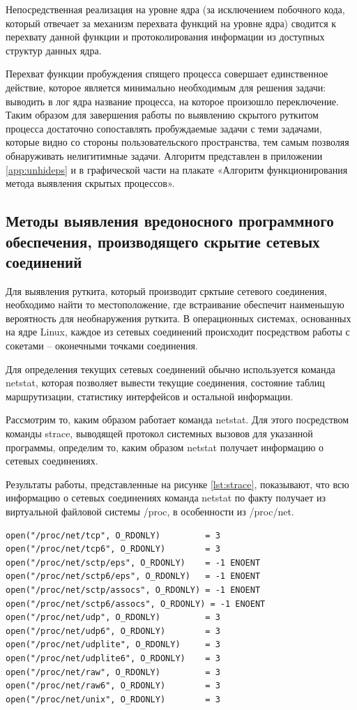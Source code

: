 \documentclass{gost7.32-2001}
\begin{document}
Непосредственная реализация на уровне ядра (за исключением побочного
кода, который отвечает за механизм перехвата функций на уровне ядра)
сводится к перехвату данной функции и протоколирования информации из
доступных структур данных ядра.

Перехват функции пробуждения спящего процесса совершает
единственное действие, которое является минимально необходимым для
решения задачи: выводить в лог ядра название процесса, на которое
произошло переключение. Таким образом для завершения работы по
выявлению скрытого руткитом процесса достаточно сопоставлять
пробуждаемые задачи с теми задачами, которые видно со стороны
пользовательского пространства, тем самым позволяя обнаруживать
нелигитимные задачи. Алгоритм представлен в приложении
\ref{app:unhideps} и в графической части на плакате «Алгоритм
функционирования метода выявления скрытых процессов».

\subsection{Методы выявления вредоносного программного обеспечения, производящего скрытие сетевых соединений}

Для выявления руткита, который производит срктыие сетевого соединения,
необходимо найти то местоположение, где встраивание обеспечит
наименьшую вероятность для необнаружения руткита. В операционных
системах, основанных на ядре Linux, каждое из сетевых соединений
происходит посредством работы с сокетами  – оконечными точками
соединения.

Для определения текущих сетевых соединений обычно используется команда
netstat, которая позволяет вывести текущие соединения, состояние
таблиц маршрутизации, статистику интерфейсов и остальной информации.

Рассмотрим то, каким образом работает команда netstat. Для этого
посредством команды strace, выводящей протокол системных вызовов для
указанной программы, определим то, каким образом netstat получает
информацию о сетевых соединениях.

Результаты работы, представленные на рисунке \ref{lst:strace}, показывают, что всю
информацию о сетевых соединениях команда netstat по факту получает из
виртуальной файловой системы /proc, в особенности из /proc/net.

\begin{lstlisting}[caption={Результаты работы strace},
    captionpos=b, float, label={lst:strace}]
open("/proc/net/tcp", O_RDONLY)         = 3
open("/proc/net/tcp6", O_RDONLY)        = 3
open("/proc/net/sctp/eps", O_RDONLY)    = -1 ENOENT
open("/proc/net/sctp6/eps", O_RDONLY)   = -1 ENOENT
open("/proc/net/sctp/assocs", O_RDONLY) = -1 ENOENT
open("/proc/net/sctp6/assocs", O_RDONLY) = -1 ENOENT
open("/proc/net/udp", O_RDONLY)         = 3
open("/proc/net/udp6", O_RDONLY)        = 3
open("/proc/net/udplite", O_RDONLY)     = 3
open("/proc/net/udplite6", O_RDONLY)    = 3
open("/proc/net/raw", O_RDONLY)         = 3
open("/proc/net/raw6", O_RDONLY)        = 3
open("/proc/net/unix", O_RDONLY)        = 3
\end{lstlisting}
\end{document}
